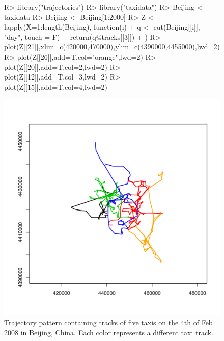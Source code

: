 \documentclass[article]{jss}
\begin{document}
\begin{figure}[!h]
\begin{center}
\begin{Sinput}
R> library("trajectories")
R> library("taxidata")
R> Beijing <- taxidata
R> Beijing <- Beijing[1:2000]
R> Z <- lapply(X=1:length(Beijing), function(i){
+    q <-  cut(Beijing[[i]], "day", touch = F)
+    return(q@tracks[[3]])
+  })
R> plot(Z[[21]],xlim=c(420000,470000),ylim=c(4390000,4455000),lwd=2)
R> plot(Z[[26]],add=T,col="orange",lwd=2)
R> plot(Z[[20]],add=T,col=2,lwd=2)
R> plot(Z[[12]],add=T,col=3,lwd=2)
R> plot(Z[[15]],add=T,col=4,lwd=2)
\end{Sinput}
\includegraphics{article-003}
\end{center}
\caption{Trajectory pattern containing tracks of five taxis on the 4th of Feb 2008 in Beijing, China. Each color represents a different taxi track.}
\label{taxitracks}
\end{figure}
\end{document}
